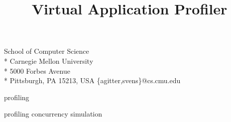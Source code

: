 \documentclass[natbib,10pt,preprint]{sigplanconf}
\begin{document}
\conferenceinfo{ }
\CopyrightYear{ }
\copyrightdata{ }



\title{Virtual Application Profiler}



           {School of Computer Science \\* Carnegie Mellon University  \\* 5000 Forbes Avenue \\* Pittsburgh, PA 15213, USA}
           {\{agitter,svens\}@cs.cmu.edu}


\maketitle




\terms
profiling

\keywords
profiling concurrency simulation






















\end{document}
